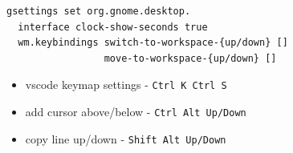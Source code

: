 \documentclass[10pt, a4paper, twocolumn]{article}
\begin{document}
\begin{verbatim}
gsettings set org.gnome.desktop.
  interface clock-show-seconds true
  wm.keybindings switch-to-workspace-{up/down} []
                 move-to-workspace-{up/down} []
\end{verbatim}

\begin{itemize}[tight_item]
  \item vscode keymap settings - \texttt{Ctrl K  Ctrl S}
  \item add cursor above/below - \texttt{Ctrl Alt Up/Down}
  \item copy line up/down - \texttt{Shift Alt Up/Down}
\end{itemize}
\end{document}
